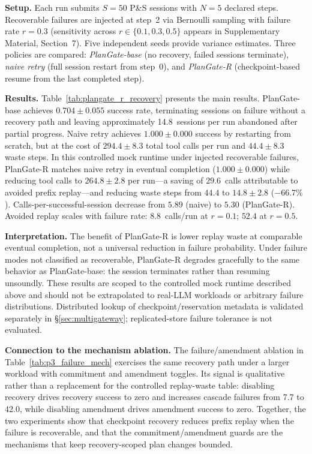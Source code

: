 \documentclass[sigconf,review,anonymous]{acmart}
\begin{document}
\textbf{Setup.}
Each run submits $S{=}50$ P\&S sessions with $N{=}5$ declared steps.
Recoverable failures are injected at step~2 via Bernoulli sampling with failure rate $r{=}0.3$ (sensitivity across $r\in\{0.1,0.3,0.5\}$ appears in Supplementary Material, Section~7).
Five independent seeds provide variance estimates.
Three policies are compared:
\emph{PlanGate-base} (no recovery, failed sessions terminate),
\emph{naive retry} (full session restart from step~0), and
\emph{PlanGate-R} (checkpoint-based resume from the last completed step).

\textbf{Results.}
Table~\ref{tab:plangate_r_recovery} presents the main results.
PlanGate-base achieves $0.704\pm0.055$ success rate, terminating sessions on failure without a recovery path and leaving approximately 14.8~sessions per run abandoned after partial progress.
Naive retry achieves $1.000\pm0.000$ success by restarting from scratch, but at the cost of $294.4\pm8.3$ total tool calls per run and $44.4\pm8.3$ waste steps.
In this controlled mock runtime under injected recoverable failures, PlanGate-R matches naive retry in eventual completion ($1.000\pm0.000$) while reducing tool calls to $264.8\pm2.8$ per run---a saving of $29.6$~calls attributable to avoided prefix replay---and reducing waste steps from $44.4$ to $14.8\pm2.8$ ($-66.7\%$).
Calls-per-successful-session decrease from $5.89$ (naive) to $5.30$ (PlanGate-R).
Avoided replay scales with failure rate: $8.8$~calls/run at $r{=}0.1$; $52.4$ at $r{=}0.5$.

\textbf{Interpretation.}
The benefit of PlanGate-R is lower replay waste at comparable eventual completion, not a universal reduction in failure probability.
Under failure modes not classified as recoverable, PlanGate-R degrades gracefully to the same behavior as PlanGate-base: the session terminates rather than resuming unsoundly.
These results are scoped to the controlled mock runtime described above and should not be extrapolated to real-LLM workloads or arbitrary failure distributions. Distributed lookup of checkpoint/reservation metadata is validated separately in \S\ref{sec:multigateway}; replicated-store failure tolerance is not evaluated.

\textbf{Connection to the mechanism ablation.}
The failure/amendment ablation in Table~\ref{tab:p3_failure_mech} exercises the same recovery path under a larger workload with commitment and amendment toggles. Its signal is qualitative rather than a replacement for the controlled replay-waste table: disabling recovery drives recovery success to zero and increases cascade failures from 7.7 to 42.0, while disabling amendment drives amendment success to zero. Together, the two experiments show that checkpoint recovery reduces prefix replay when the failure is recoverable, and that the commitment/amendment guards are the mechanisms that keep recovery-scoped plan changes bounded.
\end{document}
